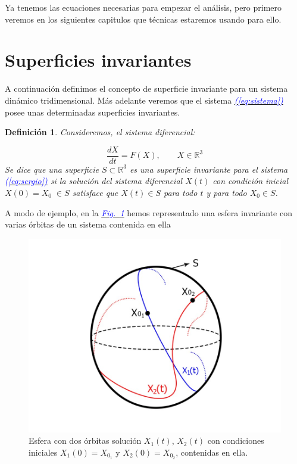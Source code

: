\documentclass[12pt,a4paper]{report} %
\newtheorem{definicion}{Definición}[chapter] %
\newcommand{\fref}[1]{\hyperref[#1]{\textcolor{blue}{\textit{Fig.~\ref*{#1}}}}}
\newcommand{\eref}[1]{\hyperref[#1]{\textcolor{blue}{\textit{(\ref*{#1})}}}}
\begin{document}
	Ya tenemos las ecuaciones necesarias para empezar el análisis, pero primero veremos en los siguientes capitulos que técnicas estaremos usando para ello.
	\newpage
	\section{Superficies invariantes}
	\label{sec:2.4}
	\noindent A continuación definimos el concepto de superficie invariante para un sistema dinámico tridimensional. Más adelante veremos que el sistema \eref{eq:sistema} posee unas determinadas superficies invariantes. 
	
	\begin{definicion}
		Consideremos, el sistema diferencial:
		
		\begin{equation}
			\label{eq:sergio}
			\frac{dX}{dt}=F(X),\qquad X\in \mathbb{R}^3
		\end{equation}\smallskip
		Se dice que una superficie $S\subset \mathbb{R}^3$ es una superficie invariante para el sistema \eref{eq:sergio} si la solución del sistema diferencial $X(t)$ con condición inicial $X(0)=X_0 \; \in S$ satisface que $X(t) \in S$ para todo $t$ y para todo $X_0 \in S$.
	\end{definicion}\smallskip
	
	A modo de ejemplo, en la \fref{fig:esfera} hemos representado una esfera invariante con varias órbitas de un sistema contenida en ella
	
	\begin{figure}[h]
		\centering
		\includegraphics[width=1\textwidth]{esfera.jpg}
		\caption{Esfera con dos órbitas solución $X_1(t)$, $X_2(t)$ con condiciones iniciales $X_1(0)=X_{0_1}$ y $X_2(0)=X_{0_2}$, contenidas en ella.}
		\label{fig:esfera}
	\end{figure}\smallskip
	\newpage
	
\end{document}
